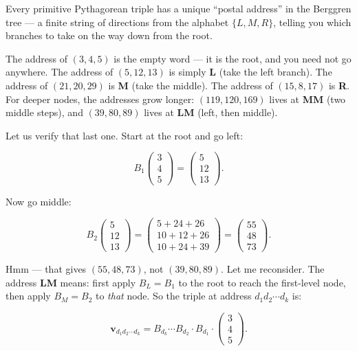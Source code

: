 Every primitive Pythagorean triple has a unique ``postal address'' in the Berggren tree --- a finite string of directions from the alphabet \(\{L, M, R\}\), telling you which branches to take on the way down from the root.

The address of \((3, 4, 5)\) is the empty word --- it is the root, and you need not go anywhere. The address of \((5, 12, 13)\) is simply \textbf{L} (take the left branch). The address of \((21, 20, 29)\) is \textbf{M} (take the middle). The address of \((15, 8, 17)\) is \textbf{R}. For deeper nodes, the addresses grow longer: \((119, 120, 169)\) lives at \textbf{MM} (two middle steps), and \((39, 80, 89)\) lives at \textbf{LM} (left, then middle).

Let us verify that last one. Start at the root and go left:

\[B_1 \begin{pmatrix} 3 \\ 4 \\ 5 \end{pmatrix} = \begin{pmatrix} 5 \\ 12 \\ 13 \end{pmatrix}.\]

Now go middle:

\[B_2 \begin{pmatrix} 5 \\ 12 \\ 13 \end{pmatrix} = \begin{pmatrix} 5 + 24 + 26 \\ 10 + 12 + 26 \\ 10 + 24 + 39 \end{pmatrix} = \begin{pmatrix} 55 \\ 48 \\ 73 \end{pmatrix}.\]

Hmm --- that gives \((55, 48, 73)\), not \((39, 80, 89)\). Let me reconsider. The address \textbf{LM} means: first apply \(B_L = B_1\) to the root to reach the first-level node, then apply \(B_M = B_2\) to \emph{that} node. So the triple at address \(d_1 d_2 \cdots d_k\) is:

\[\mathbf{v}_{d_1 d_2 \cdots d_k} = B_{d_k} \cdots B_{d_2} \cdot B_{d_1} \cdot \begin{pmatrix} 3 \\ 4 \\ 5 \end{pmatrix}.\]

